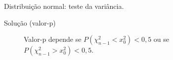 \documentclass[8pt]{beamer}
\begin{document}
\begin{frame}{Distribuição normal: teste da variância.}

\begin{block}{Solução (valor-p)}
	\begin{figure}[htbp]
		\centering
		\caption{Valor-p depende se $P\left( \chi_{n-1}^2 < x_0^2 \right)< 0,5$ ou se $P\left( \chi_{n-1}^2 > x_0^2 \right) < 0,5$.}
	\end{figure}
	
\end{block}

\end{frame}
\end{document}
